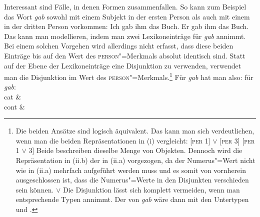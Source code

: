 Interessant sind Fälle, in denen Formen zusammenfallen. So kann zum Beispiel das Wort
\emph{gab} sowohl mit einem Subjekt in der ersten Person als auch mit einem in der dritten Person vorkommen:
\eal
\ex Ich gab ihm das Buch.
\ex Er  gab ihm das Buch.
\zl
Das kann man modellieren, indem man zwei Lexikoneinträge für \emph{gab} annimmt. Bei einem solchen Vorgehen
wird allerdings nicht erfasst, dass diese beiden Einträge bis auf den Wert des \textsc{person}"=Merkmals absolut
identisch sind. Statt auf der Ebene der Lexikoneinträge eine Disjunktion zu verwenden, verwendet man
die Disjunktion im Wert des \textsc{person}"=Merkmals.\footnote{
  Die beiden Ansätze sind logisch äquivalent. Das kann man sich verdeutlichen, wenn man die
  beiden Repräsentationen in (i) vergleicht:
  \eal
  \ex {} [\textsc{per} 1] $\vee$ [\textsc{per} 3]
  \ex {} [\textsc{per} 1 $\vee$ 3]
  \zl
  Beide beschreiben dieselbe Menge von Objekten. Dennoch wird die Repräsentation in (ii.b) der
  in (ii.a) vorgezogen, da der Numerus"=Wert nicht wie in (ii.a) mehrfach aufgeführt werden
  muss und es somit von vornherein ausgeschlossen ist, dass die Numerus"=Werte in den Disjunkten
  verschieden sein können.
  \eal
  \ex {}  $\vee$ 
  \ex {}
  \zl
Die Disjunktion lässt sich komplett vermeiden, wenn man entsprechende Typen annimmt. Der \perw von
\emph{gab} wäre dann  mit den Untertypen  und .
}
Für \emph{gab} hat man also:
\eas
\label{le-gab}
\localw für \emph{gab}:\\
\ms
{ cat &  \\
  cont &  
}
